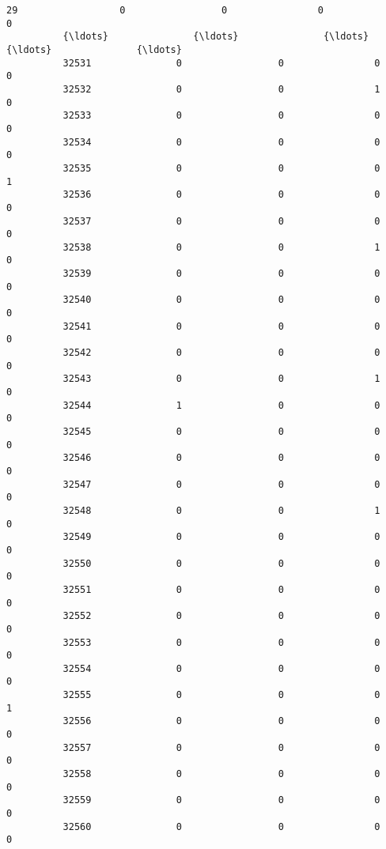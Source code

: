 \documentclass[11pt]{article}
\begin{document}
\begin{Verbatim}[commandchars=\\\{\}]
          29                  0                 0                0                 0   
          {\ldots}               {\ldots}               {\ldots}              {\ldots}               {\ldots}   
          32531               0                 0                0                 0   
          32532               0                 0                1                 0   
          32533               0                 0                0                 0   
          32534               0                 0                0                 0   
          32535               0                 0                0                 1   
          32536               0                 0                0                 0   
          32537               0                 0                0                 0   
          32538               0                 0                1                 0   
          32539               0                 0                0                 0   
          32540               0                 0                0                 0   
          32541               0                 0                0                 0   
          32542               0                 0                0                 0   
          32543               0                 0                1                 0   
          32544               1                 0                0                 0   
          32545               0                 0                0                 0   
          32546               0                 0                0                 0   
          32547               0                 0                0                 0   
          32548               0                 0                1                 0   
          32549               0                 0                0                 0   
          32550               0                 0                0                 0   
          32551               0                 0                0                 0   
          32552               0                 0                0                 0   
          32553               0                 0                0                 0   
          32554               0                 0                0                 0   
          32555               0                 0                0                 1   
          32556               0                 0                0                 0   
          32557               0                 0                0                 0   
          32558               0                 0                0                 0   
          32559               0                 0                0                 0   
          32560               0                 0                0                 0   
          

\end{Verbatim}
\end{document}
